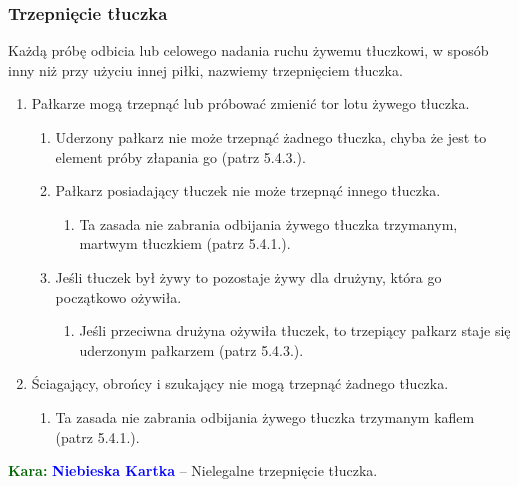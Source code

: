 \documentclass[11pt,a4paper]{article}
\newcommand\bluecard[1]{\bgroup\textcolor{darkgreen}{\textbf{Kara: }}\bgroup\textcolor{blue}{\textbf{Niebieska Kartka}} -- #1}
\begin{document}
\subsubsection{Trzepnięcie tłuczka}
Każdą próbę odbicia lub celowego nadania ruchu żywemu tłuczkowi, w sposób inny niż przy użyciu innej piłki, nazwiemy trzepnięciem tłuczka.
\begin{enumerate}
  \item Pałkarze mogą trzepnąć lub próbować zmienić tor lotu żywego tłuczka.
  \begin{enumerate}
    \item Uderzony pałkarz nie może trzepnąć żadnego tłuczka, chyba że jest to element próby złapania go (patrz 5.4.3.). %
    \item Pałkarz posiadający tłuczek nie może trzepnąć innego tłuczka.
    \begin{enumerate}
      \item Ta zasada nie zabrania odbijania żywego tłuczka trzymanym, martwym tłuczkiem (patrz 5.4.1.).
    \end{enumerate}
    \item Jeśli tłuczek był żywy to pozostaje żywy dla drużyny, która go początkowo ożywiła.
    \begin{enumerate}
      \item Jeśli przeciwna drużyna ożywiła tłuczek, to trzepiący pałkarz staje się uderzonym pałkarzem (patrz 5.4.3.). %
    \end{enumerate}
  \end{enumerate}
  \item Ściagający, obrońcy i szukający nie mogą trzepnąć żadnego tłuczka.
  \begin{enumerate}
    \item Ta zasada nie zabrania odbijania żywego tłuczka trzymanym kaflem (patrz 5.4.1.). %
  \end{enumerate}
\end{enumerate}

\bluecard{Nielegalne trzepnięcie tłuczka.}
\end{document}
